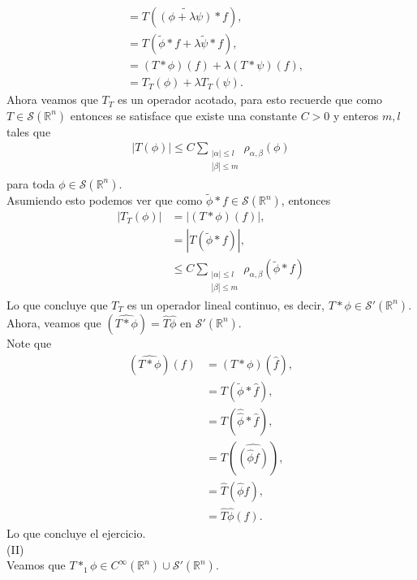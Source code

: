 \begin{homeworkProblem}
\begin{solution}
\begin{align*}
      &=T\left( \tilde{\left( \phi+\lambda\psi \right)}*f \right),\\
      &=T\left( \tilde{\phi}*f+\lambda\tilde{\psi}*f \right),\\
      &=\left( T*\phi \right)(f)+\lambda\left( T*\psi \right)(f),\\
      &=T_{T}(\phi)+\lambda T_{T}(\psi).
    \end{align*}
    \newpage
    Ahora veamos que $T_T$ es un operador acotado, para esto recuerde que como $T\in\mathcal{S}(\mathbb{R}^{n})$ entonces se satisface que existe una constante $C>0$ y enteros $m,l$ tales que
    \begin{align*}
      |T(\phi)|\leq C\sum_{\substack{|\alpha|\leq l\\|\beta|\leq m}}\rho_{\alpha,\beta}(\phi)
    \end{align*}
    para toda $\phi\in\mathcal{S}(\mathbb{R}^{n})$.\\
    Asumiendo esto podemos ver que como $\tilde{\phi}*f\in \mathcal{S}(\mathbb{R}^{n})$, entonces
    \begin{align*}
      |T_{T}(\phi)|&=\left| \left( T*\phi \right)(f) \right|,\\
      &=\left| T\left( \tilde{\phi}*f \right) \right|,\\
      &\leq C\sum_{\substack{|\alpha|\leq l\\|\beta|\leq m}}\rho_{\alpha,\beta}(\tilde{\phi}*f)
    \end{align*}
    Lo que concluye que $T_{T}$ es un operador lineal continuo, es decir, $T*\phi\in\mathcal{S}'(\mathbb{R}^{n})$.\\
    Ahora, veamos que $(\hat{T*\phi})=\hat{T}\hat{\phi}$ en $\mathcal{S}'(\mathbb{R}^{n})$.\\
    Note que
    \begin{align*}
      (\hat{T*\phi})(f)&=(T*\phi)(\hat{f}),\\
      &=T\left( \tilde{\phi}*\hat{f} \right),\\
      &=T\left( \hat{\hat{\phi}}*\hat{f} \right),\\
      &=T\left( \hat{\left(\hat{\phi}f\right)} \right),\\
      &=\hat{T}\left( \hat{\phi}f \right),\\
      &=\hat{T}\hat{\phi}(f).
    \end{align*}
    Lo que concluye el ejercicio.\\
    (II)\\
    Veamos que $T*_{1}\phi\in C^{\infty}(\mathbb{R}^{n})\cup \mathcal{S}'(\mathbb{R}^{n})$.\\

\end{solution}
\end{homeworkProblem}
